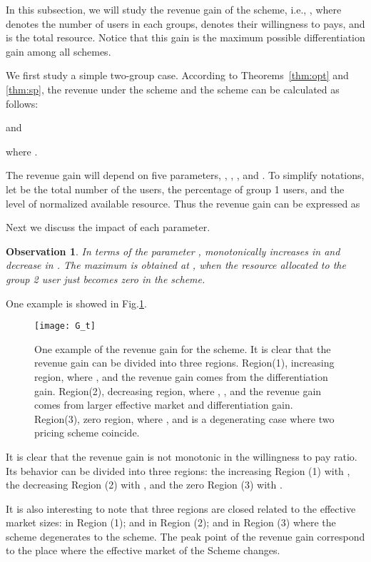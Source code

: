 \documentclass[twocolumn,10pt,twosided]{IEEEtran}
\newtheorem{observation}{Observation}
\begin{document}
In this subsection, we will study the revenue gain of the  scheme, i.e.,
, where   denotes the number of users in each groups,  denotes their willingness to pays, and   is the total resource. Notice that this gain is the maximum possible differentiation gain among all  schemes.


We first study a simple two-group case.
According to Theorems~\ref{thm:opt} and \ref{thm:sp}, the
revenue under the  scheme and the  scheme can be calculated as follows:

and

where .


The revenue gain will depend on five parameters, , , ,  and .
To simplify notations,  let  be the total
number of the users,  the percentage of
group 1 users, and  the level of normalized
available resource. Thus the revenue gain can be expressed as

Next we discuss the impact of each parameter.
\begin{observation}
In terms of the parameter ,  monotonically increases in   and decrease in . The maximum is obtained at , when the resource allocated to the group 2 user just becomes zero in the  scheme.
\end{observation}

One example is showed in Fig.\ref{fig:G_t}.
\begin{figure}
\centering
\texttt{[image: G\_t]}
\caption{One example of the revenue gain   for the  scheme. It is clear that the revenue gain can be divided into three regions.  Region(1), increasing region, where , and the revenue gain comes from the differentiation gain. Region(2), decreasing region,  where , , and the revenue gain comes from larger effective market and differentiation gain. Region(3), zero region, where , and is a degenerating case where two pricing scheme coincide. }
\label{fig:G_t}
\end{figure}


It is clear that the revenue gain is not monotonic in the willingness to pay ratio. Its behavior can be divided into three regions: the increasing Region (1) with , the decreasing Region (2) with , and the zero Region (3) with .


It is also interesting to note that three regions  are closed related to the effective market sizes:  in  Region (1);   and  in Region (2); and   in Region (3) where the  scheme degenerates to the  scheme.  The peak point of the revenue gain correspond to the place where the effective market of the  Scheme changes.
\end{document}
